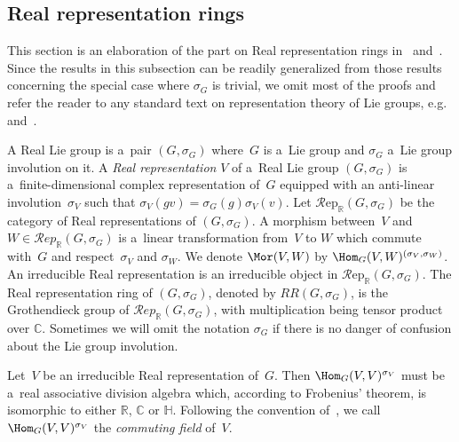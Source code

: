 \subsection{Real representation rings}
This section is an elaboration of the part on Real representation rings in~\cite{AS} and~\cite{Se}.
Since the results in this subsection can be readily generalized from those results concerning the special case
where $\sigma_G$ is trivial, we omit most of the proofs and refer the reader to any standard text on representation theory of
Lie groups, e.g.~\cite{B}
and~\cite{BtD}.
\begin{Definition}
A Real Lie group is a~pair $(G,\sigma_G)$ where~$G$ is a~Lie group and $\sigma_G$ a~Lie group involution on it.
A \emph{Real representation}
$V$ of a~Real Lie group $(G,\sigma_G)$ is a~f\/inite-dimensional complex representation of~$G$ equipped with an anti-linear involution~$\sigma_V$ such
that $\sigma_V(gv)=\sigma_G(g)\sigma_V(v)$.
Let $\mathcal{R}\text{ep}_\mathbb{R}(G,
\sigma_G)$ be the category of Real representations of $(G, \sigma_G)$.
A morphism between~$V$ and $W\in \mathcal{R}
ep_\mathbb{R}(G,
\sigma_G)$ is a~linear transformation from~$V$ to $W$ which commute with~$G$ and respect~$\sigma_V$ and $\sigma_W$.
We denote $\Mor
(V, W)$ by $\Hom_G(V, W)^{(\sigma_V, \sigma_W)}$.
An irreducible Real representation is an irreducible object in $\mathcal{R}\text{ep}_\mathbb{R}(G,
\sigma_G)$.
The Real representation ring of $(G, \sigma_G)$, denoted by $RR(G, \sigma_G)$, is the Grothendieck group of $\mathcal{R}
ep_\mathbb{R}(G,
\sigma_G)$, with multiplication being tensor product over $\mathbb{C}$.
Sometimes we will omit the notation $\sigma_G$ if there is no danger of confusion about the Lie group involution.
\end{Definition}
\begin{Remark}
Let~$V$ be an irreducible Real representation of~$G$.
Then $\Hom_G(V, V)^{\sigma_V}$ must be a~real associative division algebra which, according to Frobenius' theorem, is isomorphic to either
$\mathbb{R}$, $\mathbb{C}$ or $\mathbb{H}$.
Following the convention of~\cite{AS}, we call $\Hom_G(V, V)^{\sigma_V}$ the \emph{commuting field} of~$V$.
\end{Remark}

